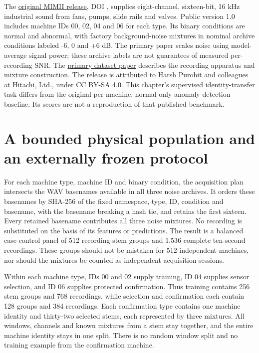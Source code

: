 \documentclass[
  11pt,
  a4paper,
]{report}
\let\singularitytexttt\texttt
\renewcommand{\texttt}[1]{\singularitytexttt{\seqsplit{#1}}}
\begin{document}
The \href{https://zenodo.org/records/3384388}{original MIMII release},
DOI \texttt{10.5281/zenodo.3384388}, supplies eight-channel,
sixteen-bit, 16 kHz industrial sound from fans, pumps, slide rails and
valves. Public version 1.0 includes machine IDs 00, 02, 04 and 06 for
each type. Its binary conditions are normal and abnormal, with factory
background-noise mixtures in nominal archive conditions labeled -6, 0
and +6 dB. The primary paper scales noise using model-average signal
power; these archive labels are not guarantees of measured per-recording
SNR. The \href{https://arxiv.org/html/1909.09347v1}{primary dataset
paper} describes the recording apparatus and mixture construction. The
release is attributed to Harsh Purohit and colleagues at Hitachi, Ltd.,
under CC BY-SA 4.0. This chapter's supervised identity-transfer task
differs from the original per-machine, normal-only anomaly-detection
baseline. Its scores are not a reproduction of that published benchmark.

\hypertarget{a-bounded-physical-population-and-an-externally-frozen-protocol}{%
\section{A bounded physical population and an externally frozen
protocol}\label{a-bounded-physical-population-and-an-externally-frozen-protocol}}

For each machine type, machine ID and binary condition, the acquisition
plan intersects the WAV basenames available in all three noise archives.
It orders these basenames by SHA-256 of the fixed namespace, type, ID,
condition and basename, with the basename breaking a hash tie, and
retains the first sixteen. Every retained basename contributes all three
noise mixtures. No recording is substituted on the basis of its features
or predictions. The result is a balanced case-control panel of 512
recording-stem groups and 1,536 complete ten-second recordings. These
groups should not be mistaken for 512 independent machines, nor should
the mixtures be counted as independent acquisition sessions.

Within each machine type, IDs 00 and 02 supply training, ID 04 supplies
sensor selection, and ID 06 supplies protected confirmation. Thus
training contains 256 stem groups and 768 recordings, while selection
and confirmation each contain 128 groups and 384 recordings. Each
confirmation type contains one machine identity and thirty-two selected
stems, each represented by three mixtures. All windows, channels and
known mixtures from a stem stay together, and the entire machine
identity stays in one split. There is no random window split and no
training example from the confirmation machine.
\end{document}
